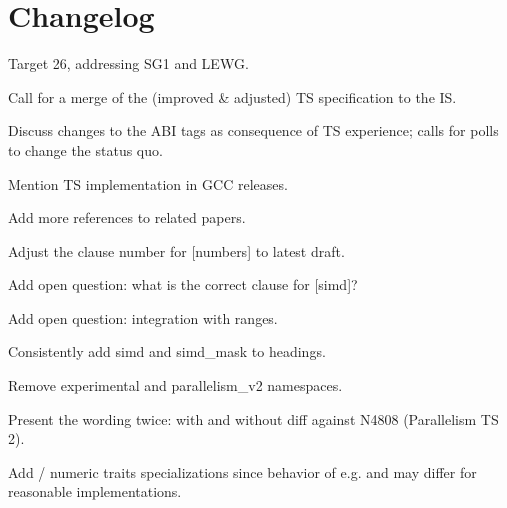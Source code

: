 \section{Changelog}
\begin{revision}
\item Target \CC{}26, addressing SG1 and LEWG.
\item Call for a merge of the (improved \& adjusted) TS specification to the IS.
\item Discuss changes to the ABI tags as consequence of TS experience; calls for polls to change the status quo.
\item Mention TS implementation in GCC releases.
\item Add more references to related papers.
\item Adjust the clause number for [numbers] to latest draft.
\item Add open question: what is the correct clause for [simd]?
\item Add open question: integration with ranges.
\item Consistently add simd and simd_mask to headings.
\item Remove experimental and parallelism_v2 namespaces.
\item Present the wording twice: with and without diff against N4808 (Parallelism TS 2).

  \todo Add  / numeric traits specializations since behavior of e.g.  and  may differ for reasonable implementations.
\end{revision}
